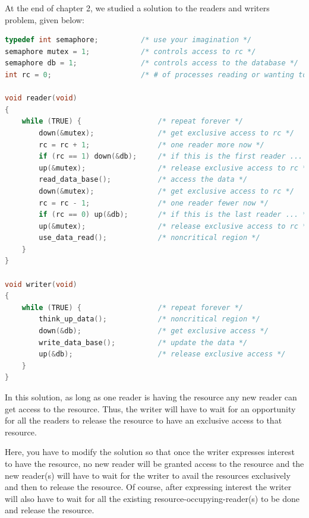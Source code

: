 \documentclass[12pt]{article}
\newenvironment{problem}[2][Problem]{\begin{trivlist}
\item[\hskip \labelsep {\bfseries #1}\hskip \labelsep {\bfseries #2.}]}{\end{trivlist}}
\begin{document}
\begin{problem}{5}
At the end of chapter 2, we studied a solution to the readers and writers problem,
given below: 

\begin{lstlisting}[language=C, caption=readers-preference]
typedef int semaphore;          /* use your imagination */
semaphore mutex = 1;            /* controls access to rc */
semaphore db = 1;               /* controls access to the database */
int rc = 0;                     /* # of processes reading or wanting to */

void reader(void)
{
    while (TRUE) {                  /* repeat forever */
        down(&mutex);               /* get exclusive access to rc */
        rc = rc + 1;                /* one reader more now */
        if (rc == 1) down(&db);     /* if this is the first reader ... */
        up(&mutex);                 /* release exclusive access to rc */
        read_data_base();           /* access the data */
        down(&mutex);               /* get exclusive access to rc */
        rc = rc - 1;                /* one reader fewer now */
        if (rc == 0) up(&db);       /* if this is the last reader ... */
        up(&mutex);                 /* release exclusive access to rc */
        use_data_read();            /* noncritical region */
    }
}

void writer(void)
{
    while (TRUE) {                  /* repeat forever */
        think_up_data();            /* noncritical region */
        down(&db);                  /* get exclusive access */
        write_data_base();          /* update the data */
        up(&db);                    /* release exclusive access */
    }
}
\end{lstlisting}
In this solution, as long as one reader is having the resource any new reader can get access to the
resource. Thus, the writer will have to wait for an opportunity for all the readers to release the
resource to have an exclusive access to that resource.

Here, you have to modify the solution so that once the writer expresses interest to have the
resource, no new reader will be granted access to the resource and the new reader(s) will have to
wait for the writer to avail the resources exclusively and then to release the resource. Of course,
after expressing interest the writer will also have to wait for all the existing resource-occupying-reader(s) to be done and release the resource. 
\end{problem}
\pagebreak
\end{document}
